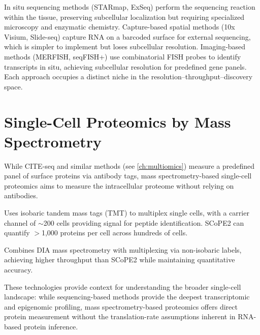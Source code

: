 \begin{keyconcept}[title={In Situ vs.\ Capture-Based Spatial Methods}]
In situ sequencing methods (STARmap, ExSeq) perform the sequencing reaction within the tissue, preserving subcellular localization but requiring specialized microscopy and enzymatic chemistry. Capture-based spatial methods (10x Visium, Slide-seq) capture RNA on a barcoded surface for external sequencing, which is simpler to implement but loses subcellular resolution. Imaging-based methods (MERFISH, seqFISH+) use combinatorial FISH probes to identify transcripts in situ, achieving subcellular resolution for predefined gene panels. Each approach occupies a distinct niche in the resolution--throughput--discovery space.
\end{keyconcept}


\section{Single-Cell Proteomics by Mass Spectrometry}
\label{sec:emerging:sc-proteomics}

While CITE-seq and similar methods (see \cref{ch:multiomics}) measure a predefined panel of surface proteins via antibody tags, mass spectrometry-based single-cell proteomics aims to measure the intracellular proteome without relying on antibodies.

\begin{description}[style=nextline, itemsep=3pt]
  \item[SCoPE2 (Single Cell ProtEomics by Mass Spectrometry, version 2)] Uses isobaric tandem mass tags (TMT) to multiplex single cells, with a carrier channel of $\sim$200 cells providing signal for peptide identification. SCoPE2 can quantify $>$1,000 proteins per cell across hundreds of cells.

  \item[plexDIA (Multiplexed Data-Independent Acquisition)] Combines DIA mass spectrometry with multiplexing via non-isobaric labels, achieving higher throughput than SCoPE2 while maintaining quantitative accuracy.
\end{description}

These technologies provide context for understanding the broader single-cell landscape: while sequencing-based methods provide the deepest transcriptomic and epigenomic profiling, mass spectrometry-based proteomics offers direct protein measurement without the translation-rate assumptions inherent in RNA-based protein inference.


